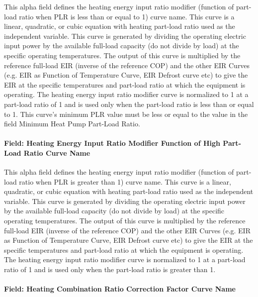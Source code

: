 This alpha field defines the heating energy input ratio modifier (function of part-load ratio when PLR is less than or equal to 1) curve name. This curve is a linear, quadratic, or cubic equation with heating part-load ratio used as the independent variable. This curve is generated by dividing the operating electric input power by the available full-load capacity (do not divide by load) at the specific operating temperatures. The output of this curve is multiplied by the reference full-load EIR (inverse of the reference COP) and the other EIR Curves (e.g. EIR as
Function of Temperature Curve, EIR Defrost curve etc) to give the EIR at the specific temperatures and part-load ratio at which the equipment is operating. The heating energy input ratio modifier curve is normalized to 1 at a part-load ratio of 1 and is used only when the part-load ratio is less than or equal to 1. This curve's minimum PLR value must be less or equal to the value in the field Minimum Heat Pump Part-Load Ratio.

\paragraph{Field: Heating Energy Input Ratio Modifier Function of High Part-Load Ratio Curve Name}\label{field-heating-energy-input-ratio-modifier-function-of-high-part-load-ratio-curve-name}

This alpha field defines the heating energy input ratio modifier (function of part-load ratio when PLR is greater than 1) curve name. This curve is a linear, quadratic, or cubic equation with heating part-load ratio used as the independent variable. This curve is generated by dividing the operating electric input power by the available full-load capacity (do not divide by load) at the specific operating temperatures. The output of this curve is multiplied by the reference full-load EIR (inverse of the reference COP) and the other EIR Curves (e.g. EIR as Function of Temperature Curve, EIR Defrost curve etc) to give the EIR at the specific temperatures and part-load ratio at which the equipment is operating. The heating energy input ratio modifier curve is normalized to 1 at a part-load ratio of 1 and is used only when the part-load ratio is greater than 1.

\paragraph{Field: Heating Combination Ratio Correction Factor Curve Name}\label{field-heating-combination-ratio-correction-factor-curve-name}

